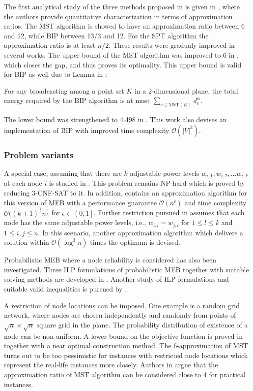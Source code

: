 The first analytical study of the three methods proposed in \cite{wieselthier00} is given in \cite{wan02}, where the authors provide quantitative characterization in terms of approximation ratios.
The MST algorithm is showed to have an approximation ratio between 6 and 12, while BIP between 13/3 and 12.
For the SPT algorithm the approximation ratio is at least $n/2$.
These results were gradualy improved in several works. 
The upper bound of the MST algorithm was improved to 6 in \cite{ambuhl05}, which closes the gap, and thus proves its optimality.
This upper bound is valid for BIP as well due to Lemma in \cite{wan02}:
\begin{lemma}
For any broadcasting among a point set $K$ in a 2-dimensional plane, the total energy required by the BIP algorithm is at most $\sum_{e\in \text{MST}(K)}d_e^\alpha$.
\end{lemma}
The lower bound was strengthened to 4.498 in \cite{bauer09}. 
This work also devises an implementation of BIP with improved time complexity $\mathcal{O}(|V|^2)$.

\subsubsection{Problem variants}

A special case, assuming that there are $k$ adjustable power levels $w_{i,1},w_{i,2},\dots w_{i,k}$ at each node $i$ is studied in \cite{liang02}.
This problem remains NP-hard which is proved by reducing \textsc{3-CNF-SAT} to it.
In addition, \cite{liang02} contains an approximation algorithm for this version of MEB with a performance guarantee $\mathcal{O}(n^\epsilon)$ and 
time complexity $\mathcal{O}((k+1)^{\frac{1}{\epsilon}} n^{\frac{3}{\epsilon}}$ for $\epsilon\in \left(0,1\right]$.
Further restriction pursued in \cite{liang02} assumes that each node has the same adjustable power levels, i.e., $w_{i,l}=w_{j,l}$ for $1\leq l\leq k$ and $1\leq i,j\leq n$.
In this scenario, another approximation algorithm which delivers a solution within $\mathcal{O}(\log^3 n)$ times the optimum is devised.

Probabilistic MEB where a node reliability is considered has also been investigated.
Three ILP formulations of probabilistic MEB together with suitable solving methods are developed in \cite{montemanni08}.
Another study of ILP formulations and suitable valid inequalities is pursued by \cite{barta10}.

A restriction of node locations can be imposed.
One example is a random grid network, where nodes are chosen independently and randomly from points of $\sqrt{n}\times\sqrt{n}$ square grid in the plane.
The probability distribution of existence of a node can be non-uniform.
A lower bound on the objective function is proved in \cite{calamoneri08} together with a near optimal construction method.
The 6-approximation of MST turns out to be too pessimistic for instances with restricted node locations which represent the real-life instances more closely.
Authors in \cite{flammini07} argue that the approximation ratio of MST algorithm can be considered close to 4 for practical instances.

